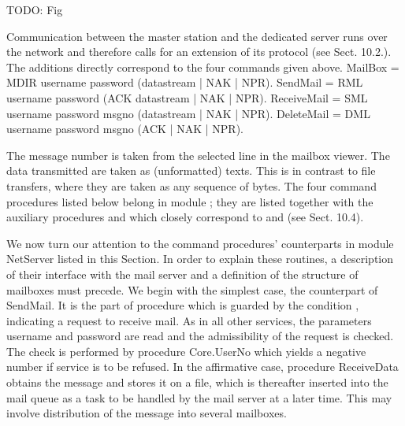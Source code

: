 TODO: Fig

Communication between the master station and the dedicated server runs over the network and therefore calls for an extension of its protocol (see Sect. 10.2.). The additions directly correspond to the four commands given above.
\begintt
MailBox = MDIR username password (datastream | NAK | NPR).
SendMail = RML username password (ACK datastream | NAK | NPR).
ReceiveMail = SML username password msgno (datastream | NAK | NPR).
DeleteMail = DML username password msgno (ACK | NAK | NPR).
\endtt

\noindent  The message number is taken from the selected line in the mailbox viewer. The data transmitted are taken as (unformatted) texts. This is in contrast to file transfers, where they are taken as any sequence of bytes. The four command procedures listed below belong in module ; they are listed together with the auxiliary procedures  and  which closely correspond to  and  (see Sect. 10.4).

We now turn our attention to the command procedures' counterparts in module NetServer listed in this Section. In order to explain these routines, a description of their interface with the mail server and a definition of the structure of mailboxes must precede. We begin with the simplest case, the counterpart of SendMail. It is the part of procedure  which is guarded by the condition , indicating a request to receive mail. As in all other services, the parameters username and password are read and the admissibility of the request is checked. The check is performed by procedure Core.UserNo which yields a negative number if service is to be refused. In the affirmative case, procedure ReceiveData obtains the message and stores it on a file, which is thereafter inserted into the mail queue as a task to be handled by the mail server at a later time. This may involve distribution of the message into several mailboxes.

